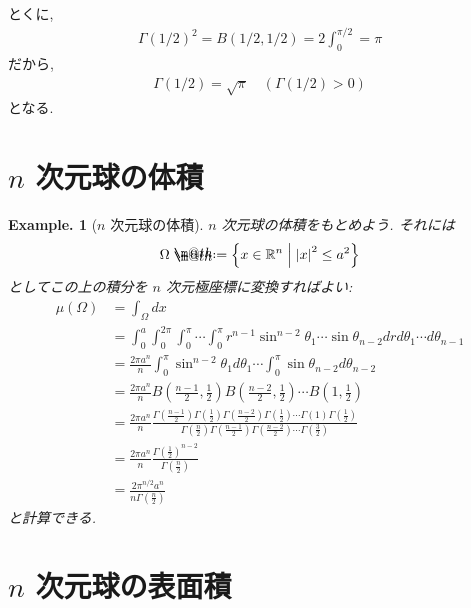 \documentclass[openany, a4paper, oneside]{jsbook}
\makeatletter
\newcommand*{\defeq}{\mathrel{\rlap{%
\raisebox{0.3ex}{$\m@th\cdot$}}%
\raisebox{-0.3ex}{$\m@th\cdot$}}%
=}
\theoremstyle{break}
\theoremstyle{breakdefn}
\newtheorem{ex}[thm]{Example.}
\newcommand{\abs}[1]{\left|#1\right|}
\newcommand{\rbk}[1]{\left (#1\right)}
\newcommand{\relmiddle}[1]{\mathrel{}\middle#1\mathrel{}}
\newcommand{\set}[2]{\left\{#1 \relmiddle| #2\right\}}
\newcommand{\bbRn}{\mathbb{R}^n}
\makeatother
\begin{document}
とくに,
\begin{align}
 \Gamma(1/2)^2
 =
 B(1/2, 1/2)
 =
 2\int_0^{\pi / 2}
 =
 \pi
\end{align}
だから,
\begin{align}
 \Gamma(1/2)
 =
 \sqrt{\pi} \quad (\Gamma(1/2) > 0)
\end{align}
となる.
\section{$n$ 次元球の体積}


\begin{ex}[$n$ 次元球の体積]
$n$ 次元球の体積をもとめよう.
それには
\begin{align}
 \Omega
 \defeq
 \set{x \in \bbRn}{\abs{x}^2 \le a^2}
\end{align}
としてこの上の積分を $n$ 次元極座標に変換すればよい:
\begin{align}
 \mu(\Omega)
 &=
 \int_{\Omega}dx \\
 &=
 \int_0^a\int_0^{2\pi} \int_0^{\pi} \cdots \int_0^{\pi} r^{n-1}\sin^{n-2} \theta_1
  \cdots \sin \theta_{n-2} drd\theta_1 \cdots d\theta_{n-1} \\
 &=
 \frac{2\pi a^n}{n} \int_0^{\pi} \sin^{n-2}\theta_1d\theta_1
  \cdots  \int_0^{\pi} \sin \theta_{n-2}d\theta_{n-2} \\
 &=
 \frac{2\pi a^n}{n} B\rbk{\frac{n-1}{2}, \frac{1}{2}} B\rbk{\frac{n-2}{2}, \frac{1}{2}}
  \cdots B \rbk{1, \frac{1}{2}} \\
 &=
 \frac{2\pi a^n}{n}
  \frac{\Gamma \rbk{\frac{n-1}{2}} \Gamma \rbk{\frac{1}{2}} \Gamma \rbk{\frac{n-2}{2}} \Gamma \rbk{\frac{1}{2}}
  \cdots \Gamma(1) \Gamma \rbk{\frac{1}{2}}}
  {\Gamma \rbk{\frac{n}{2}} \Gamma \rbk{\frac{n-1}{2}} \Gamma \rbk{\frac{n-2}{2}} \cdots \Gamma \rbk{\frac{3}{2}}} \\
 &=
 \frac{2\pi a^n}{n}
  \frac{\Gamma \rbk{\frac{1}{2}}^{n-2}}{\Gamma \rbk{\frac{n}{2}}} \\
 &=
 \frac{2\pi^{n/2} a^n}{n \Gamma \rbk{\frac{n}{2}}}
\end{align}
と計算できる.
\end{ex}
\section{$n$ 次元球の表面積}
\end{document}
